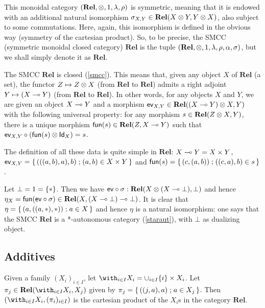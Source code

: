 This monoidal category \((\mathbf{Rel},\otimes,1,\lambda,\rho)\) is
symmetric, meaning that it is endowed with an additional natural
isomorphism \(\sigma_{X,Y}\in\mathbf{Rel}(X\otimes Y,Y\otimes X)\), also
subject to some commutations. Here, again, this isomorphism is defined
in the obvious way (symmetry of the cartesian product). So, to be
precise, the SMCC (symmetric monoidal closed category) \(\mathbf{Rel}\)
is the tuple \((\mathbf{Rel},\otimes,1,\lambda,\rho,\alpha,\sigma)\),
but we shall simply denote it as \(\mathbf{Rel}\).

The SMCC \(\mathbf{Rel}\) is closed (\cref{smcc}). This means that, given any object
\(X\) of \(\mathbf{Rel}\) (a set), the functor \(Z\mapsto Z\otimes X\)
(from \(\mathbf{Rel}\) to \(\mathbf{Rel}\)) admits a right adjoint
\(Y\mapsto (X\multimap Y)\) (from \(\mathbf{Rel}\) to \(\mathbf{Rel}\)). In
other words, for any objects \(X\) and \(Y\), we are given an object
\(X\multimap Y\) and a morphism
\(\mathsf{ev}_{X,Y}\in\mathbf{Rel}((X\multimap Y)\otimes X,Y)\) with the
following universal property: for any morphism
\(s\in\mathbf{Rel}(Z\otimes X,Y)\), there is a unique morphism
\(\mathsf{fun}(s)\in\mathbf{Rel}(Z,X\multimap Y)\) such that
\(\mathsf{ev}_{X,Y}\circ(\mathsf{fun}(s)\otimes\mathsf{Id}_X)=s\).

The definition of all these data is quite simple in \(\mathbf{Rel}\):
\(X\multimap Y=X\times Y\),
\(\mathsf{ev}_{X,Y}=\left\{\,{(((a,b),a),b)}\mathrel{;}{(a,b)\in X\times Y}\,\right\}\) and
\(\mathsf{fun}(s)=\left\{\,{(c,(a,b))}\mathrel{;}{((c,a),b)\in s}\,\right\}\).

Let \(\bot=1=\{*\}\). Then we have
\(\mathsf{ev}\circ\sigma:\mathbf{Rel}(X\otimes(X\multimap\bot),\bot)\) and
hence
\(\eta_X=\mathsf{fun}(\mathsf{ev}\circ\sigma)\in\mathbf{Rel}(X,(X\multimap\bot)\multimap\bot)\).
It is clear that \(\eta=\left\{\,{(a,((a,*),*))}\mathrel{;}{a\in X}\,\right\}\) and hence \(\eta\)
is a natural isomorphism: one says that the SMCC \(\mathbf{Rel}\) is a
*-autonomous category (\cref{staraut}), with \(\bot\) as dualizing object.

\subsection{Additives}\label{additives-2}

Given a family \((X_i)_{i\in I}\), let
\(\with_{i\in I}X_i=\cup_{i\in I}\{i\}\times X_i\). Let
\(\pi_j\in\mathbf{Rel}(\with_{i\in I}X_i,X_j)\) given by
\(\pi_j=\left\{\,{((j,a),a)}\mathrel{;}{a\in X_j}\,\right\}\). Then
\((\with_{i\in I}X_i,(\pi_i)_{i\in I})\) is the cartesian product of the
\(X_i\)s in the category \(\mathbf{Rel}\).

